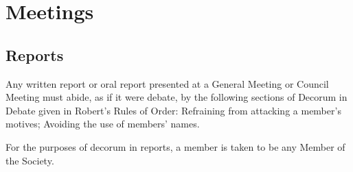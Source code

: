 \section{Meetings}
\subsection{Reports}
\begin{longenum}[ label*=\thesubsection.\arabic*., align=left]
	\item Any written report or oral report presented at a General Meeting or Council Meeting must abide, as if it were debate, by the following sections of Decorum in Debate given in Robert's Rules of Order: Refraining from attacking a member's motives; Avoiding the use of members' names. 
    \begin{longenum}[ label*=\arabic*., align=left]
		\item For the purposes of decorum in reports, a member is taken to be any Member of the Society.
	\end{longenum}
\end{longenum}
